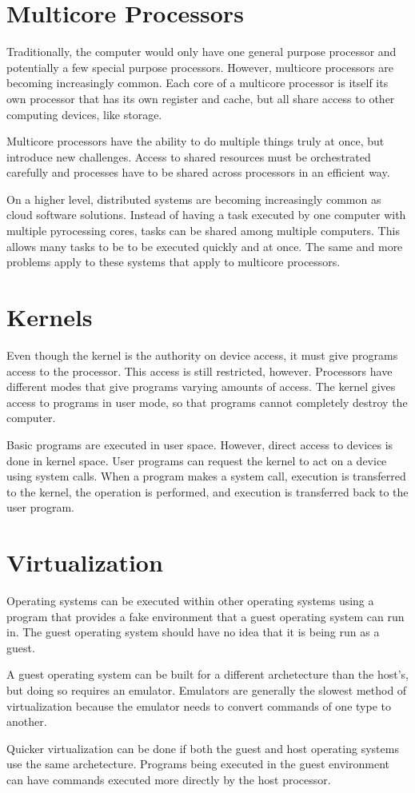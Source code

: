\documentclass{article}
\begin{document}
\section{Multicore Processors}

Traditionally, the computer would only have one general purpose processor and
potentially a few special purpose processors. However, multicore processors are
becoming increasingly common. Each core of a multicore processor is itself its
own processor that has its own register and cache, but all share access to
other computing devices, like storage.

Multicore processors have the ability to do multiple things truly at once, but
introduce new challenges. Access to shared resources must be orchestrated
carefully and processes have to be shared across processors in an efficient
way.

On a higher level, distributed systems are becoming increasingly common as
cloud software solutions. Instead of having a task executed by one computer
with multiple pyrocessing cores, tasks can be shared among multiple computers.
This allows many tasks to be to be executed quickly and at once. The same
and more problems apply to these systems that apply to multicore processors.

\section{Kernels}

Even though the kernel is the authority on device access, it must give programs
access to the processor. This access is still restricted, however. Processors
have different modes that give programs varying amounts of access. The kernel
gives access to programs in user mode, so that programs cannot completely
destroy the computer.

Basic programs are executed in user space. However, direct access to devices is
done in kernel space. User programs can request the kernel to act on a device
using system calls. When a program makes a system call, execution is
transferred to the kernel, the operation is performed, and execution is
transferred back to the user program.

\section{Virtualization}

Operating systems can be executed within other operating systems using a
program that provides a fake environment that a guest operating system can run
in. The guest operating system should have no idea that it is being run as a
guest.

A guest operating system can be built for a different archetecture than the
host's, but doing so requires an emulator. Emulators are generally the slowest
method of virtualization because the emulator needs to convert commands of one
type to another.

Quicker virtualization can be done if both the guest and host operating systems
use the same archetecture. Programs being executed in the guest environment can
have commands executed more directly by the host processor.
\end{document}
